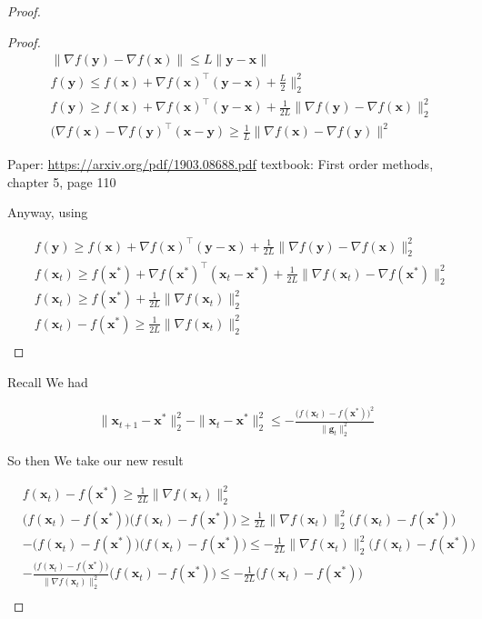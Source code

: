 \documentclass{article}
\begin{document}
\begin{proof}
\begin{proof}
		\begin{align}
			&\|\nabla f(\mathbf{y}) - \nabla f(\mathbf{x})\| \le L\|\mathbf{y} - \mathbf{x}\|\\
			&f(\mathbf{y}) \le f(\mathbf{x}) + \nabla f(\mathbf{x})^\top (\mathbf{y} - \mathbf{x}) + \frac{L}{2}\|^2_2\\
			&f(\mathbf{y}) \ge f(\mathbf{x}) + \nabla f(\mathbf{x})^\top(\mathbf{y}-\mathbf{x}) + \frac{1}{2L} \|\nabla f(\mathbf{y}) - \nabla f(\mathbf{x})\|^2_2\\
		& (\nabla f(\mathbf{x}) - \nabla f(\mathbf{y})^\top (\mathbf{x}-\mathbf{y}) \ge \frac{1}{L}\|\nabla f(\mathbf{x}) - \nabla f(\mathbf{y})\|^2	
		\end{align}
		
		
		Paper:		
		\url{https://arxiv.org/pdf/1903.08688.pdf}
		textbook: First order methods, chapter 5, page 110
		
		Anyway, using 
		
		\begin{align}
			&f(\mathbf{y}) \ge f(\mathbf{x}) + \nabla f(\mathbf{x})^\top(\mathbf{y}-\mathbf{x}) + \frac{1}{2L} \|\nabla f(\mathbf{y}) - \nabla f(\mathbf{x})\|^2_2\\
			&f(\mathbf{x}_t) \ge f(\mathbf{x}^*) + \nabla f(\mathbf{x}^*)^\top(\mathbf{x}_t-\mathbf{x}^*) +  \frac{1}{2L} \|\nabla f(\mathbf{x}_t) - \nabla f(\mathbf{x}^*)\|^2_2\\
			&f(\mathbf{x}_t) \ge f(\mathbf{x}^*)  +  \frac{1}{2L} \|\nabla f(\mathbf{x}_t)\|^2_2\\
			&f(\mathbf{x}_t) -  f(\mathbf{x}^*)\ge    \frac{1}{2L} \|\nabla f(\mathbf{x}_t)\|^2_2\\
		\end{align}
		
	\end{proof}


	Recall We had 
	
	\begin{align}
		\|\mathbf{x}_{t+1} - \mathbf{x}^*\|^2_2 - \|\mathbf{x}_{t} - \mathbf{x}^*\|^2_2 \le -\frac{\big( f(\mathbf{x}_t) - f(\mathbf{x}^*) \big)^2}{\|\mathbf{g}_t\|^2_2}
	\end{align}
	
	So then We take our new result
	
	\begin{align}
		&f(\mathbf{x}_t) -  f(\mathbf{x}^*)\ge    \frac{1}{2L} \|\nabla f(\mathbf{x}_t)\|^2_2\\
		&\big(f(\mathbf{x}_t) -  f(\mathbf{x}^*)\big) \big(f(\mathbf{x}_t) -  f(\mathbf{x}^*)\big) \ge    \frac{1}{2L} \|\nabla f(\mathbf{x}_t)\|^2_2 \big(f(\mathbf{x}_t) -  f(\mathbf{x}^*)\big)\\
		&-\big(f(\mathbf{x}_t) -  f(\mathbf{x}^*)\big) \big(f(\mathbf{x}_t) -  f(\mathbf{x}^*)\big) \le    -\frac{1}{2L} \|\nabla f(\mathbf{x}_t)\|^2_2 \big(f(\mathbf{x}_t) -  f(\mathbf{x}^*)\big)\\
		&-\frac{\big(f(\mathbf{x}_t) -  f(\mathbf{x}^*)\big)}{\|\nabla f(\mathbf{x}_t)\|^2_2} \big(f(\mathbf{x}_t) -  f(\mathbf{x}^*)\big) \le    -\frac{1}{2L}  \big(f(\mathbf{x}_t) -  f(\mathbf{x}^*)\big)\\
	\end{align}
		

\end{proof}
\end{document}
